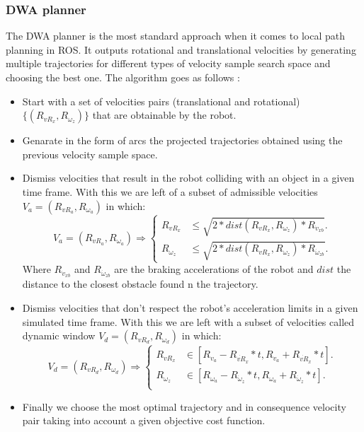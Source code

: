\subsubsection{DWA planner}\label{dwa}
The \ac{DWA} planner is the most standard approach when it comes to local path planning in \ac{ROS}. It outputs  rotational and translational velocities by generating multiple trajectories for different types of velocity sample search space and choosing the best one. The algorithm goes as follows \cite{inbookdwa}:
\begin{itemize}
    \item Start with a set of velocities pairs (translational and rotational) $\{(R_{vR_x},R_{ \omega_z}  )\}$ that are obtainable by the robot.
    \item Genarate in the form of arcs the projected trajectories obtained using the previous velocity sample space.
    \item Dismiss velocities that result in the robot colliding with an object in a given time frame. With this we are left of a subset of admissible velocities $V_a=(R_{vR_a},R_{ \omega_a})$ in which:
    \begin{equation}
         V_a=(R_{vR_a},R_{ \omega_a}) \Rightarrow \begin{cases}
    R_{vR_x} & 	\leq \sqrt{2*dist(R_{vR_x},R_{ \omega_z})*R_{\dot{v}_{xb}}}.\\
    R_{ \omega_z}  &  	\leq \sqrt{2*dist(R_{vR_x},R_{ \omega_z})*R_{\dot{\omega}_{zb}}}.
  \end{cases}
    \end{equation}
    Where $R_{\dot{v}_{xb}}$ and $R_{\dot{\omega}_{zb}}$ are the braking accelerations of the robot and $dist$ the distance to the closest obstacle found n the trajectory.
    
    
    \item Dismiss velocities that don't respect the robot's acceleration limits in a given simulated time frame. With this we are left with a subset of velocities called dynamic window $V_d=(R_{vR_d},R_{ \omega_d})$  in which:
    \begin{equation}
         V_d=(R_{vR_d},R_{ \omega_d}) \Rightarrow \begin{cases}
    R_{vR_x} & 	\in [R_{v_a}-R_{\dot{vR}_{x}}*t,R_{v_a} + R_{\dot{vR}_{x}}*t].\\
    R_{\omega_z} & 	\in [R_{ \omega_a}-R_{\dot{\omega}_{z}}*t,R_{\omega_a}+R_{\dot{\omega}_{z}}*t].\\
  \end{cases}
    \end{equation}
    \item Finally we choose  the most optimal trajectory and in consequence velocity pair taking into account a given objective cost function.
    \end{itemize}
